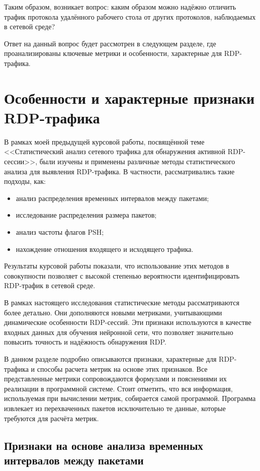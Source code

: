\documentclass[bachelor, och, coursework]{SCWorks}
\begin{document}
Таким образом, возникает вопрос: каким образом можно надёжно отличить трафик протокола удалённого рабочего стола от других протоколов, наблюдаемых в сетевой среде?

Ответ на данный вопрос будет рассмотрен в следующем разделе, где проанализированы ключевые метрики и особенности, характерные для RDP-трафика.

\section{Особенности и характерные признаки RDP-трафика}

В рамках моей предыдущей курсовой работы, посвящённой теме <<Статистический анализ сетевого трафика для обнаружения активной RDP-сессии>>, 
были изучены и применены различные методы статистического анализа для выявления RDP-трафика. В частности, рассматривались такие подходы, как:  

\begin{itemize}
  \item анализ распределения временных интервалов между пакетами;  
  \item исследование распределения размера пакетов;  
  \item анализ частоты флагов PSH;  
  \item нахождение отношения входящего и исходящего трафика.  
\end{itemize}

Результаты курсовой работы показали, что использование этих методов в совокупности позволяет с высокой степенью вероятности идентифицировать 
RDP-трафик в сетевой среде.  


В рамках настоящего исследования статистические методы рассматриваются более детально. Они дополняются новыми метриками, 
учитывающими динамические особенности RDP-сессий. Эти признаки используются в качестве входных данных для обучения нейронной сети, что позволяет 
значительно повысить точность и надёжность обнаружения RDP.

В данном разделе подробно описываются признаки, характерные для RDP-трафика и способы расчета метрик на основе этих признаков.
Все представленные метрики сопровождаются формулами и пояснениями их реализации в программной системе. Стоит отметить, что вся информация, 
используемая при вычислении метрик, собирается самой программой. Программа извлекает из перехваченных пакетов исключительно те данные, которые 
требуются для расчёта метрик.

\subsection{Признаки на основе анализа временных интервалов между пакетами}
\end{document}
